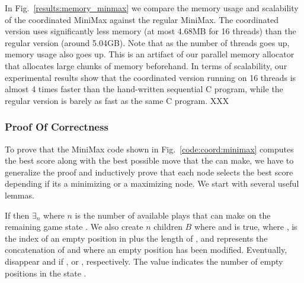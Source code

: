 In Fig.~\ref{results:memory_minmax} we compare the memory usage and scalability
of the coordinated MiniMax against the regular MiniMax. The coordinated version
uses significantly less memory (at most 4.68MB for 16 threads) than the regular
version (around 5.04GB). Note that as the number of threads goes up, memory
usage also goes up. This is an artifact of our parallel memory allocator that
allocates large chunks of memory beforehand. In terms of scalability, our
experimental results show that the coordinated version running on 16 threads is
almost 4 times faster than the hand-written sequential C program, while the
regular version is barely as fast as the same C program. XXX

\subsubsection{Proof Of Correctness}

To prove that the MiniMax code shown in Fig.~\ref{code:coord:minimax} computes
the best score along with the best possible move that the  can
make, we have to generalize the proof and inductively prove that each node
selects the best score depending if its a minimizing or a maximizing node. We
start with several useful lemmas.

\begin{lemma}

If  then $\exists_n$ where $n$ is the number of available plays that
 can make on the remaining game state .  We also
create $n$ children $B$ where  and  is true, where ,  is the index of an empty position in
 plus the length of , and  represents
the concatenation of  and  where an empty
position has been modified. Eventually,  disappear and if
,  or ,
respectively. The value  indicates the number of empty positions in
the state .

\end{lemma}


